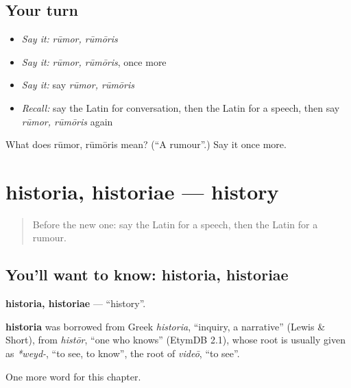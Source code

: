 \subsection*{Your turn}
\begin{itemize}
\raggedright
  \item \emph{Say it:} \emph{rūmor, rūmōris}
  \item \emph{Say it:} \emph{rūmor, rūmōris}, once more
  \item \emph{Say it:} say \emph{rūmor, rūmōris}
  \item \emph{Recall:} say the Latin for conversation, then the Latin for a speech, then say \emph{rūmor, rūmōris} again
\end{itemize}

\begin{tcolorbox}[breakable,colback=teal!4,colframe=teal!35!black,title={Before you move on}]
What does rūmor, rūmōris mean? (\textquotedblleft{}A rumour\textquotedblright{}.) Say it once more.
\end{tcolorbox}
\section[historia, historiae]{historia, historiae — history}

\label{lesson:LA-C194-historia}



\begin{quote}
Before the new one: say the Latin for a speech, then the Latin for a rumour.
\end{quote}

\subsection*{You'll want to know: historia, historiae}
\textbf{historia, historiae} — \textquotedblleft{}history\textquotedblright{}.

\begin{cousinweb}
\textbf{historia} was borrowed from Greek \emph{historia}, \textquotedblleft{}inquiry, a narrative\textquotedblright{} (Lewis \& Short), from \emph{histōr}, \textquotedblleft{}one who knows\textquotedblright{} (EtymDB 2.1), whose root is usually given as \emph{*weyd-}, \textquotedblleft{}to see, to know\textquotedblright{}, the root of \emph{videō}, \textquotedblleft{}to see\textquotedblright{}.
\end{cousinweb}

\begin{grammarlens}[title={What you've built}]
One more word for this chapter.
\end{grammarlens}

